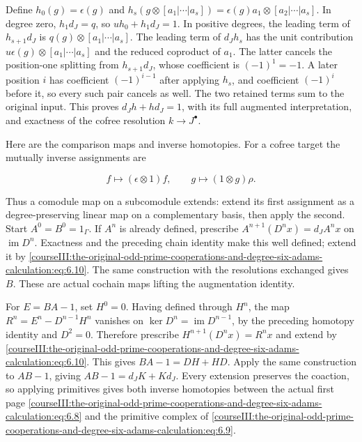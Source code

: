 Define \(h_0(g)=\epsilon(g)\) and
\(h_s(g\otimes[a_1|\cdots|a_s])=\epsilon(g)a_1\otimes[a_2|\cdots|a_s]\).
In degree zero, \(h_1d_J=q\), so \(u h_0+h_1d_J=1\). In positive degrees, the leading term of \(h_{s+1}d_J\) is \(q(g)\otimes[a_1|\cdots|a_s]\). The leading term of \(d_Jh_s\) has the unit contribution \(u\epsilon(g)\otimes[a_1|\cdots|a_s]\) and the reduced coproduct of \(a_1\). The latter cancels the position-one splitting from \(h_{s+1}d_J\), whose coefficient is \((-1)^1=-1\). A later position \(i\) has coefficient \((-1)^{i-1}\) after applying \(h_s\), and coefficient \((-1)^i\) before it, so every such pair cancels as well. The two retained terms sum to the original input. This proves \(d_Jh+h d_J=1\), with its full augmented interpretation, and exactness of the cofree resolution \(k\to J^\bullet\).

Here are the comparison maps and inverse homotopies. For a cofree target the mutually inverse assignments are

\begin{equation}
f\longmapsto(\epsilon\otimes1)f,
 \qquad g\longmapsto(1\otimes g)\rho.
 \label{courseIII:the-original-odd-prime-cooperations-and-degree-six-adams-calculation:eq:6.10}
\end{equation}

Thus a comodule map on a subcomodule extends: extend its first assignment as a degree-preserving linear map on a complementary basis, then apply the second. Start \(A^0=B^0=1_\Gamma\). If \(A^n\) is already defined, prescribe
\(A^{n+1}(D^nx)=d_JA^nx\) on \(\operatorname{im}D^n\). Exactness and the preceding chain identity make this well defined; extend it by \eqref{courseIII:the-original-odd-prime-cooperations-and-degree-six-adams-calculation:eq:6.10}. The same construction with the resolutions exchanged gives \(B\). These are actual cochain maps lifting the augmentation identity.

For \(E=BA-1\), set \(H^0=0\). Having defined through \(H^n\), the map \(R^n=E^n-D^{n-1}H^n\) vanishes on \(\ker D^n=\operatorname{im}D^{n-1}\), by the preceding homotopy identity and \(D^2=0\). Therefore prescribe \(H^{n+1}(D^nx)=R^nx\) and extend by \eqref{courseIII:the-original-odd-prime-cooperations-and-degree-six-adams-calculation:eq:6.10}. This gives \(BA-1=DH+HD\). Apply the same construction to \(AB-1\), giving \(AB-1=d_JK+Kd_J\). Every extension preserves the coaction, so applying primitives gives both inverse homotopies between the actual first page \eqref{courseIII:the-original-odd-prime-cooperations-and-degree-six-adams-calculation:eq:6.8} and the primitive complex of \eqref{courseIII:the-original-odd-prime-cooperations-and-degree-six-adams-calculation:eq:6.9}.


